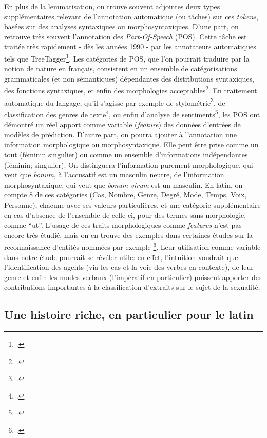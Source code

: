 En plus de la lemmatisation, on trouve souvent adjointes deux types supplémentaires  relevant de l'annotation automatique (ou tâches) sur ces \textit{tokens}, basées sur des analyses syntaxiques ou morphosyntaxiques. D'une part, on retrouve très souvent l'annotation des \textit{Part-Of-Speech} (POS). Cette tâche est traitée très rapidement - dès les années 1990 - par les annotateurs automatiques tels que TreeTagger\footcite{schmid1994treetagger}. Les catégories de POS, que l'on pourrait traduire par la notion de nature en français, consistent en un ensemble de catégorisations grammaticales (et non sémantiques) dépendantes des distributions syntaxiques, des fonctions syntaxiques, et enfin des morphologies acceptables\footcite{schachter1985parts}. En traitement automatique du langage, qu'il s'agisse par exemple de stylométrie\footcite{Cafieroeaax5489}, de classification des genres de texte\footcite{feldman2009part}, ou enfin d'analyse de sentiments\footcite{wang2015pos}, les POS ont démontré un réel apport comme variable (\textit{feature}) des données d'entrées de modèles de prédiction. D'autre part, on pourra ajouter à l'annotation une information morphologique ou morphosyntaxique. Elle peut être prise comme un tout (féminin singulier) ou comme un ensemble d'informations indépendantes (féminin; singulier). On distinguera l'information purement morphologique, qui veut que \textit{bonum}, à l'accusatif est un masculin neutre, de l'information morphosyntaxique, qui veut que \textit{bonum virum} est un masculin. En latin, on compte 8 de ces catégories (Cas, Nombre, Genre, Degré, Mode, Temps, Voix, Personne), chacune avec ses valeurs particulières, et une catégorie supplémentaire en cas d'absence de l'ensemble de celle-ci, pour des termes sans morphologie, comme \enquote{ut}. L'usage de ces traits morphologiques comme \textit{features} n'est pas encore très étudié, %
mais on en trouve des exemples dans certaines études sur la reconnaissance d'entités nommées par exemple \footcite[Par exemple]{zirikly2014named}. Leur utilisation comme variable dans notre étude pourrait se révéler utile: en effet, l'intuition voudrait que l'identification des agents (via les cas et la voie des verbes en contexte), de leur genre et enfin les modes verbaux (l'impératif en particulier) puissent apporter des contributions importantes à la classification d'extraits sur le sujet de la sexualité.


\subsection{Une histoire riche, en particulier pour le latin}

